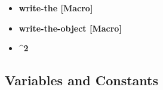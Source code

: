 \documentclass [11pt]{book}
\begin{document}
\begin{itemize}
\item {}
\label{prim:write-the}
\textbf{write-the [Macro]}





\item {}
\label{prim:write-the-object}
\textbf{write-the-object [Macro]}





\item {}
\label{prim:^2}
\textbf{^2}





\end{itemize}



\subsection{Variables and Constants}

\label{subsec:variablesandconstants}
\end{document}
